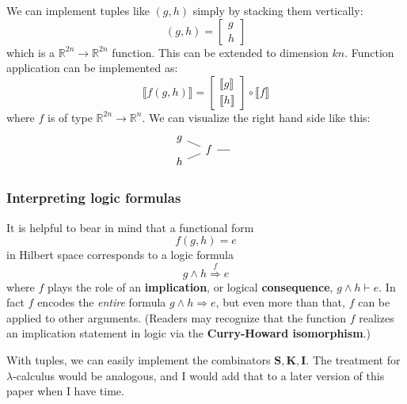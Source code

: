 We can implement tuples like $(g, h)$ simply by stacking them vertically:
\begin{equation}
(g, h) = \begin{bmatrix}
g \\
h
\end{bmatrix}
\end{equation}
which is a $\mathbb{R}^{2n} \rightarrow \mathbb{R}^{2n}$ function.  This can be extended to dimension $kn$.  Function application can be implemented as:
\begin{equation}
\llbracket f(g, h) \rrbracket =
\begin{bmatrix}
\llbracket g \rrbracket \\
\llbracket h \rrbracket
\end{bmatrix} \circ \llbracket f \rrbracket
\end{equation}
where $f$ is of type $\mathbb{R}^{2n} \rightarrow \mathbb{R}^n$.  We can visualize the right hand side like this:
\begin{equation}
\begin{tikzcd}[column sep=small, row sep=-0.5em]
g \arrow[-, dr] & & \\
& f \arrow[-, r] & {} \\
h \arrow[-, ur] & &
\end{tikzcd} 
\end{equation}

\subsubsection*{Interpreting logic formulas}

It is helpful to bear in mind that a functional form
\begin{equation}
f(g, h) = e
\end{equation}
in Hilbert space corresponds to a logic formula
\begin{equation}
g \wedge h \stackrel{f}{\Longrightarrow} e
\end{equation}
where $f$ plays the role of an \textbf{implication}, or logical \textbf{consequence}, $g \wedge h \vdash e$.  In fact $f$ encodes the \textit{entire} formula $g \wedge h \Rightarrow e$, but even more than that, $f$ can be applied to other arguments.  (Readers may recognize that the function $f$ realizes an implication statement in logic via the \textbf{Curry-Howard isomorphism}.)

With tuples, we can easily implement the combinators $\mathbf{S}, \mathbf{K}, \mathbf{I}$.  The treatment for $\lambda$-calculus would be analogous, and I would add that to a later version of this paper when I have time.

